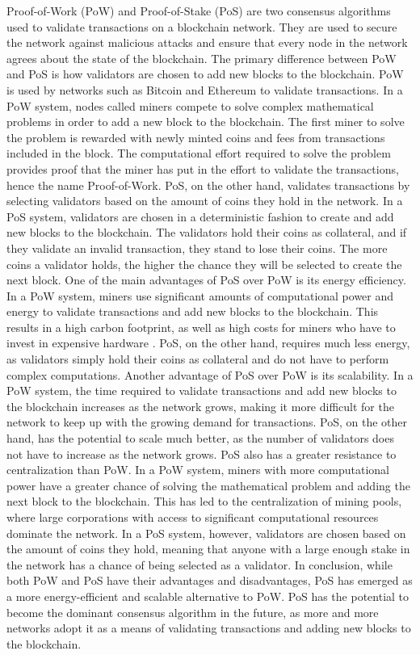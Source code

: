 \documentclass[target=mst,aauheader=]{thud}
\begin{document}
    Proof-of-Work (PoW) and Proof-of-Stake (PoS) are two consensus algorithms used to validate transactions on a blockchain network. They are used to secure the network against malicious attacks and ensure that every node in the network agrees about the state of the blockchain. The primary difference between PoW and PoS is how validators are chosen to add new blocks to the blockchain.
    PoW is used by networks such as Bitcoin and Ethereum to validate transactions. In a PoW system, nodes called miners compete to solve complex mathematical problems in order to add a new block to the blockchain. The first miner to solve the problem is rewarded with newly minted coins and fees from transactions included in the block. The computational effort required to solve the problem provides proof that the miner has put in the effort to validate the transactions, hence the name Proof-of-Work.
    PoS, on the other hand, validates transactions by selecting validators based on the amount of coins they hold in the network. In a PoS system, validators are chosen in a deterministic fashion to create and add new blocks to the blockchain. The validators hold their coins as collateral, and if they validate an invalid transaction, they stand to lose their coins. The more coins a validator holds, the higher the chance they will be selected to create the next block.
    One of the main advantages of PoS over PoW is its energy efficiency. In a PoW system, miners use significant amounts of computational power and energy to validate transactions and add new blocks to the blockchain. This results in a high carbon footprint, as well as high costs for miners who have to invest in expensive hardware \cite{zochowski2019proof}. PoS, on the other hand, requires much less energy, as validators simply hold their coins as collateral and do not have to perform complex computations.
    Another advantage of PoS over PoW is its scalability. In a PoW system, the time required to validate transactions and add new blocks to the blockchain increases as the network grows, making it more difficult for the network to keep up with the growing demand for transactions. PoS, on the other hand, has the potential to scale much better, as the number of validators does not have to increase as the network grows.
    PoS also has a greater resistance to centralization than PoW. In a PoW system, miners with more computational power have a greater chance of solving the mathematical problem and adding the next block to the blockchain. This has led to the centralization of mining pools, where large corporations with access to significant computational resources dominate the network. In a PoS system, however, validators are chosen based on the amount of coins they hold, meaning that anyone with a large enough stake in the network has a chance of being selected as a validator.
    In conclusion, while both PoW and PoS have their advantages and disadvantages, PoS has emerged as a more energy-efficient and scalable alternative to PoW. PoS has the potential to become the dominant consensus algorithm in the future, as more and more networks adopt it as a means of validating transactions and adding new blocks to the blockchain.    
\end{document}
